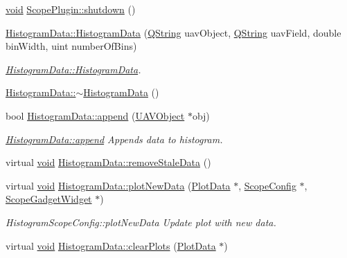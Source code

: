 \begin{DoxyCompactItemize}
\item 
\hyperlink{group___u_a_v_objects_plugin_ga444cf2ff3f0ecbe028adce838d373f5c}{void} \hyperlink{group___scope_plugin_ga13799130d5adbbdc55c06e4597df6a08}{\-Scope\-Plugin\-::shutdown} ()
\item 
\hyperlink{group___scope_plugin_ga72e50dd5614c61d39ec10aa120c47d3b}{\-Histogram\-Data\-::\-Histogram\-Data} (\hyperlink{group___u_a_v_objects_plugin_gab9d252f49c333c94a72f97ce3105a32d}{\-Q\-String} uav\-Object, \hyperlink{group___u_a_v_objects_plugin_gab9d252f49c333c94a72f97ce3105a32d}{\-Q\-String} uav\-Field, double bin\-Width, uint number\-Of\-Bins)
\begin{DoxyCompactList}\small\item\em \hyperlink{group___scope_plugin_ga72e50dd5614c61d39ec10aa120c47d3b}{\-Histogram\-Data\-::\-Histogram\-Data}. \end{DoxyCompactList}\item 
\hyperlink{group___scope_plugin_ga4469655db4ea251dc664d6537ac56c5a}{\-Histogram\-Data\-::$\sim$\-Histogram\-Data} ()
\item 
bool \hyperlink{group___scope_plugin_ga0d810ba48c487ee265cdc1386b23bece}{\-Histogram\-Data\-::append} (\hyperlink{class_u_a_v_object}{\-U\-A\-V\-Object} $\ast$obj)
\begin{DoxyCompactList}\small\item\em \hyperlink{group___scope_plugin_ga0d810ba48c487ee265cdc1386b23bece}{\-Histogram\-Data\-::append} \-Appends data to histogram. \end{DoxyCompactList}\item 
virtual \hyperlink{group___u_a_v_objects_plugin_ga444cf2ff3f0ecbe028adce838d373f5c}{void} \hyperlink{group___scope_plugin_ga347aa15de12fde18bb0b88245ef0ff57}{\-Histogram\-Data\-::remove\-Stale\-Data} ()
\item 
virtual \hyperlink{group___u_a_v_objects_plugin_ga444cf2ff3f0ecbe028adce838d373f5c}{void} \hyperlink{group___scope_plugin_gac17c425a9e59f0b1187d76a8cc13e6ad}{\-Histogram\-Data\-::plot\-New\-Data} (\hyperlink{class_plot_data}{\-Plot\-Data} $\ast$, \hyperlink{class_scope_config}{\-Scope\-Config} $\ast$, \hyperlink{class_scope_gadget_widget}{\-Scope\-Gadget\-Widget} $\ast$)
\begin{DoxyCompactList}\small\item\em \-Histogram\-Scope\-Config\-::plot\-New\-Data \-Update plot with new data. \end{DoxyCompactList}\item 
virtual \hyperlink{group___u_a_v_objects_plugin_ga444cf2ff3f0ecbe028adce838d373f5c}{void} \hyperlink{group___scope_plugin_gaba86940fa8881f8a36b2bafacd9d59f6}{\-Histogram\-Data\-::clear\-Plots} (\hyperlink{class_plot_data}{\-Plot\-Data} $\ast$)

\end{DoxyCompactItemize}
